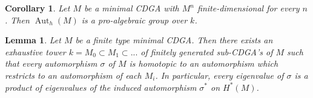 \documentclass[11pt]{amsart}
\newtheorem{lemma}[theorem]{Lemma}
\newtheorem{corollary}[theorem]{Corollary}
\theoremstyle{definition}
\numberwithin{equation}{section}
\numberwithin{equation}{section}
\DeclareMathOperator{\Aut}{Aut}
\begin{document}
\begin{corollary}
Let $M$ be a minimal CDGA with $M^n$ finite-dimensional for every $n$. Then     $\Aut_h(M)$ is a pro-algebraic group over $k$.
\end{corollary}

\begin{lemma}\label{Lemma: rigidity of automorphisms of a minimal model}
Let $M$ be a finite type minimal CDGA. Then there exists an exhaustive tower $k=M_0\subset M_1\subset ...$ of finitely generated sub-CDGA's of $M$ such that every automorphism $\sigma$ of $M$ is homotopic to an automorphism which restricts to an automorphism of each $M_i$. In particular, every eigenvalue of $\sigma$ is a product of eigenvalues of the induced automorphism $\sigma^*$ on $H^*(M)$. 
\end{lemma}
\end{document}
